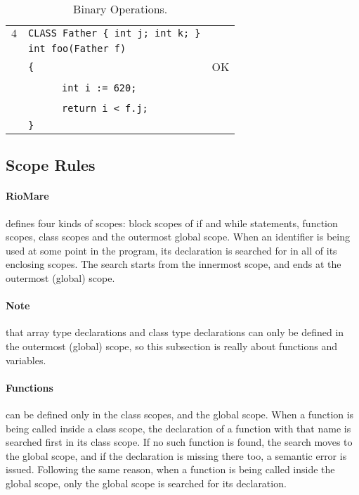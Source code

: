 \documentclass{article}
\begin{document}
\begin{table}[h]
\begin{tabular}{|l|l|l|}
\hline
 $4$ & \verb"CLASS Father { int j; int k; }" &    \\
     & \verb"int foo(Father f)"              &    \\
     & \verb"{"                              & OK \\
     & ~ ~ ~ ~\verb"int i := 620;"           &    \\
     & ~ ~ ~ ~\verb"return i < f.j;"         &    \\
     & \verb"}"                              &    \\
\hline
\end{tabular}
\caption{Binary Operations.
\label{Table_Code_Examples_Binary_Operations}}
\end{table}
\newpage
\subsection{Scope Rules}
\label{subsection_Scope_Rules}
\paragraph{RioMare} defines four kinds of scopes:
block scopes of if and while statements,
function scopes,
class scopes and
the outermost global scope.
When an identifier is being used at some point in the program,
its declaration is searched for in all of its enclosing scopes.
The search starts from the innermost scope, 
and ends at the outermost (global) scope.
\paragraph{Note} that array type declarations and
class type declarations can only be defined
in the outermost (global) scope,
so this subsection is really about functions and variables.
\paragraph{Functions} can be defined only in the class scopes, and the global scope.
When a function is being called inside a class scope, the declaration
of a function with that name is searched first in its class scope.
If no such function is found, the search moves to the global scope,
and if the declaration is missing there too, a semantic error is issued.
Following the same reason, when a function is being called inside the global scope,
only the global scope is searched for its declaration.
\end{document}

